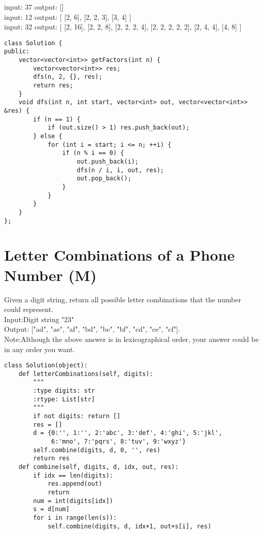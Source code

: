 input: 37
output: 
[]\\

input: 12
output:
[
  [2, 6],
  [2, 2, 3],
  [3, 4]
]\\

input: 32
output:
[
  [2, 16],
  [2, 2, 8],
  [2, 2, 2, 4],
  [2, 2, 2, 2, 2],
  [2, 4, 4],
  [4, 8]
]\\

\begin{lstlisting}
class Solution {
public:
    vector<vector<int>> getFactors(int n) {
        vector<vector<int>> res;
        dfs(n, 2, {}, res);
        return res;
    }
    void dfs(int n, int start, vector<int> out, vector<vector<int>> &res) {
        if (n == 1) {
            if (out.size() > 1) res.push_back(out);
        } else {
            for (int i = start; i <= n; ++i) {
                if (n % i == 0) {
                    out.push_back(i);
                    dfs(n / i, i, out, res);
                    out.pop_back();
                }
            }
        }
    }
};
\end{lstlisting}


\section{Letter Combinations of a Phone Number (M)}
Given a digit string, return all possible letter combinations that the number could represent.\\

Input:Digit string "23"\\
Output: ["ad", "ae", "af", "bd", "be", "bf", "cd", "ce", "cf"].\\

Note:Although the above answer is in lexicographical order, your answer could be in any order you want. \\

\begin{lstlisting}
class Solution(object):
    def letterCombinations(self, digits):
        """
        :type digits: str
        :rtype: List[str]
        """
        if not digits: return []
        res = []
        d = {0:'', 1:'', 2:'abc', 3:'def', 4:'ghi', 5:'jkl',
             6:'mno', 7:'pqrs', 8:'tuv', 9:'wxyz'}
        self.combine(digits, d, 0, '', res)
        return res
    def combine(self, digits, d, idx, out, res):
        if idx == len(digits):
            res.append(out)
            return
        num = int(digits[idx])
        s = d[num]
        for i in range(len(s)):
            self.combine(digits, d, idx+1, out+s[i], res)
\end{lstlisting}

